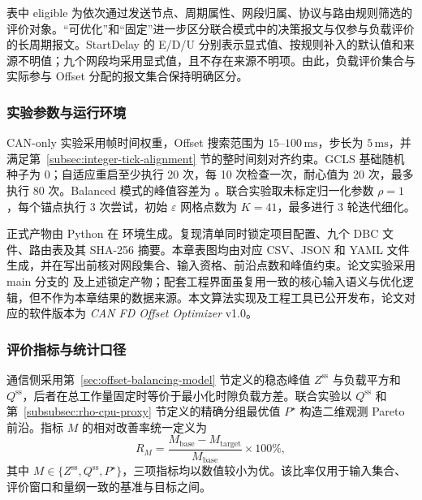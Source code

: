 \documentclass[UTF8,a4paper,twoside,zihao=-4]{ctexart}
\numberwithin{equation}{section}
\numberwithin{figure}{section}
\numberwithin{table}{section}
\theoremstyle{definition}
\numberwithin{algocf}{section}
\begin{document}


表中 eligible 为依次通过发送节点、周期属性、网段归属、协议与路由规则筛选的评价对象。“可优化”和“固定”进一步区分联合模式中的决策报文与仅参与负载评价的长周期报文。StartDelay 的 E/D/U 分别表示显式值、按规则补入的默认值和来源不明值；九个网段均采用显式值，且不存在来源不明项。由此，负载评价集合与实际参与 Offset 分配的报文集合保持明确区分。

\subsubsection{实验参数与运行环境}
\label{subsubsec:exp-parameters-environment}

CAN-only 实验采用帧时间权重，Offset 搜索范围为 $15$--$100\,\mathrm{ms}$，步长为 $5\,\mathrm{ms}$，并满足第~\ref{subsec:integer-tick-alignment} 节的整时间刻对齐约束。GCLS 基础随机种子为 0；自适应重启至少执行 20 次，每 10 次检查一次，耐心值为 20 次，最多执行 80 次。Balanced 模式的峰值容差为 \BalancedTolerancePercent。联合实验取未标定归一化参数 $\rho=1$，每个锚点执行 3 次尝试，初始 $\varepsilon$ 网格点数为 $K=41$，最多进行 3 轮迭代细化。

正式产物由 Python \FinalPythonVersion{} 在 \FinalRuntimeOS{} 环境生成。复现清单同时锁定项目配置、九个 DBC 文件、路由表及其 SHA-256 摘要。本章表图均由对应 CSV、JSON 和 YAML 文件生成，并在写出前核对网段集合、输入资格、前沿点数和峰值约束。论文实验采用 main 分支的  及上述锁定产物；配套工程界面虽复用一致的核心输入语义与优化逻辑，但不作为本章结果的数据来源。本文算法实现及工程工具已公开发布，论文对应的软件版本为 \emph{CAN FD Offset Optimizer} v1.0\cite{hao2026canfdoptimizer}。

\subsubsection{评价指标与统计口径}
\label{subsubsec:exp-metrics-gates}

通信侧采用第~\ref{sec:offset-balancing-model} 节定义的稳态峰值 $Z^{\mathrm{ss}}$ 与负载平方和 $Q^{\mathrm{ss}}$，后者在总工作量固定时等价于最小化时隙负载方差。联合实验以 $Q^{\mathrm{ss}}$ 和第~\ref{subsubsec:rho-cpu-proxy} 节定义的精确分组最优值 $P^\star$ 构造二维观测 Pareto 前沿。指标 $M$ 的相对改善率统一定义为
\begin{equation}
 R_M
 =
 \frac{M_{\mathrm{base}}-M_{\mathrm{target}}}
 {M_{\mathrm{base}}}\times 100\%,
\label{eq:exp-relative-reduction}
\end{equation}
其中 $M\in\{Z^{\mathrm{ss}},Q^{\mathrm{ss}},P^\star\}$，三项指标均以数值较小为优。该比率仅用于输入集合、评价窗口和量纲一致的基准与目标之间。
\end{document}
